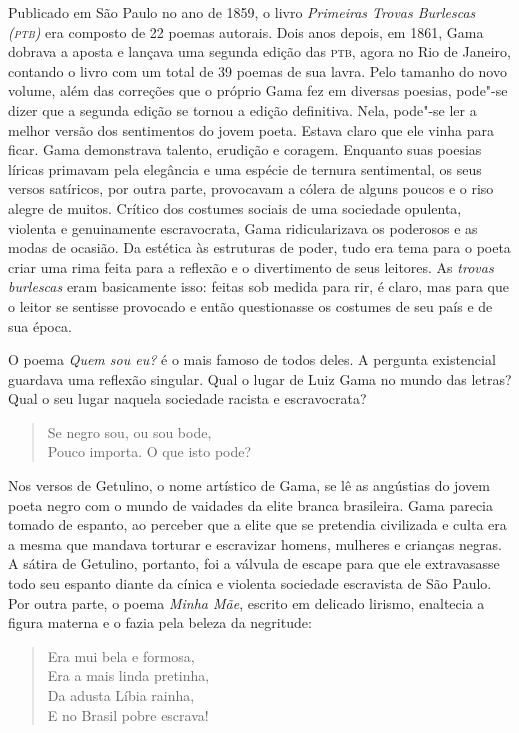 Publicado em São Paulo no ano de 1859, o livro \emph{Primeiras Trovas
Burlescas (\textsc{ptb})} era composto de 22 poemas autorais. Dois anos depois,
em 1861, Gama dobrava a aposta e lançava uma segunda edição das
\textsc{ptb}, agora no Rio de Janeiro, contando o livro com um total de 39
poemas de sua lavra. Pelo tamanho do novo volume, além das correções que
o próprio Gama fez em diversas poesias, pode"-se dizer que a segunda
edição se tornou a edição definitiva. Nela, pode"-se ler a melhor versão
dos sentimentos do jovem poeta. Estava claro que ele vinha para ficar.
Gama demonstrava talento, erudição e coragem. Enquanto suas poesias
líricas primavam pela elegância e uma espécie de ternura sentimental, os
seus versos satíricos, por outra parte, provocavam a cólera de alguns
poucos e o riso alegre de muitos. Crítico dos costumes sociais de uma
sociedade opulenta, violenta e genuinamente escravocrata, Gama
ridicularizava os poderosos e as modas de ocasião. Da estética às
estruturas de poder, tudo era tema para o poeta criar uma rima feita
para a reflexão e o divertimento de seus leitores. As \emph{trovas
burlescas} eram basicamente isso: feitas sob medida para rir, é claro,
mas para que o leitor se sentisse provocado e então questionasse os
costumes de seu país e de sua época.

O poema \emph{Quem sou eu?} é o mais famoso de todos deles. A pergunta
existencial guardava uma reflexão singular. Qual o lugar de Luiz Gama no
mundo das letras? Qual o seu lugar naquela sociedade racista e
escravocrata?

\begin{verse}
Se negro sou, ou sou bode,\\
Pouco importa. O que isto pode?
\end{verse}

Nos versos de Getulino, o nome artístico de Gama, se lê as angústias do
jovem poeta negro com o mundo de vaidades da elite branca brasileira. 
Gama parecia tomado de espanto, ao perceber que a elite que se pretendia civilizada e culta
era a mesma que mandava torturar e escravizar homens, mulheres
e crianças negras. A sátira de Getulino, portanto, foi a válvula de
escape para que ele extravasasse todo seu espanto diante da cínica e
violenta sociedade escravista de São Paulo. Por outra parte, o poema
\emph{Minha Mãe}, escrito em delicado lirismo, enaltecia a figura
materna e o fazia pela beleza da negritude:

\begin{verse}
Era mui bela e formosa,\\
Era a mais linda pretinha,\\
Da adusta Líbia rainha,\\
E no Brasil pobre escrava!
\end{verse}

